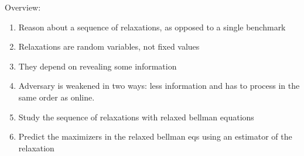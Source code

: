 Overview:
\begin{enumerate}
\item Reason about a sequence of relaxations, as opposed to a single benchmark
\item Relaxations are random variables, not fixed values
\item They depend on revealing some information
\item Adversary is weakened in two ways: less information and has to process in the same order as online.
\item Study the sequence of relaxations with relaxed bellman equations
\item Predict the maximizers in the relaxed bellman eqs using an estimator of the relaxation
\end{enumerate}